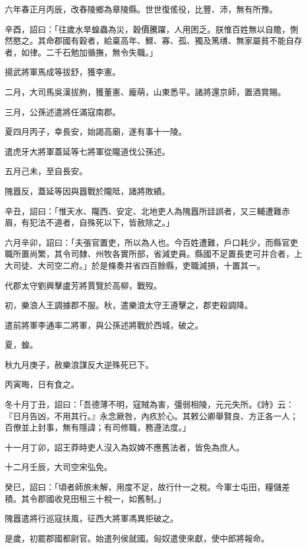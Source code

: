 
\begin{pinyinscope}
六年春正月丙辰，改舂陵鄉為章陵縣。世世復傜役，比豐、沛，無有所豫。

辛酉，詔曰：「往歲水旱蝗蟲為災，穀價騰躍，人用困乏。朕惟百姓無以自贍，惻然愍之。其命郡國有穀者，給稟高年、鰥、寡、孤、獨及篤缮、無家屬貧不能自存者，如律。二千石勉加循撫，無令失職。」

揚武將軍馬成等拔舒，獲李憲。

二月，大司馬吳漢拔朐，獲董憲、龐萌，山東悉平。諸將還京師，置酒賞賜。

三月，公孫述遣將任滿寇南郡。

夏四月丙子，幸長安，始謁高廟，遂有事十一陵。

遣虎牙大將軍蓋延等七將軍從隴道伐公孫述。

五月己未，至自長安。

隗囂反，蓋延等因與囂戰於隴阺，諸將敗績。

辛丑，詔曰：「惟天水、隴西、安定、北地吏人為隗囂所詿誤者，又三輔遭難赤眉，有犯法不道者，自殊死以下，皆赦除之。」

六月辛卯，詔曰：「夫張官置吏，所以為人也。今百姓遭難，戶口耗少，而縣官吏職所置尚繁，其令司隸、州牧各實所部，省減吏員。縣國不足置長吏可并合者，上大司徒、大司空二府。」於是條奏并省四百餘縣，吏職減損，十置其一。

代郡太守劉興擊盧芳將賈覽於高柳，戰歿。

初，樂浪人王調據郡不服。秋，遣樂浪太守王遵擊之，郡吏殺調降。

遣前將軍李通率二將軍，與公孫述將戰於西城，破之。

夏，蝗。

秋九月庚子，赦樂浪謀反大逆殊死已下。

丙寅晦，日有食之。

冬十月丁丑，詔曰：「吾德薄不明，寇賊為害，彊弱相陵，元元失所。《詩》云：『日月告凶，不用其行。』永念厥咎，內疚於心。其敕公卿舉賢良、方正各一人；百僚並上封事，無有隱諱；有司修職，務遵法度。」

十一月丁卯，詔王莽時吏人沒入為奴婢不應舊法者，皆免為庶人。

十二月壬辰，大司空宋弘免。

癸巳，詔曰：「頃者師旅未解，用度不足，故行什一之稅。今軍士屯田，糧儲差積。其令郡國收見田租三十稅一，如舊制。」

隗囂遣將行巡寇扶風，征西大將軍馮異拒破之。

是歲，初罷郡國都尉官。始遣列侯就國。匈奴遣使來獻，使中郎將報命。


\end{pinyinscope}
